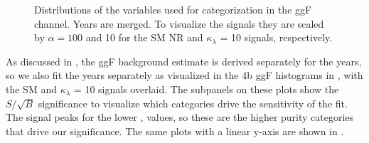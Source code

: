 \begin{figure}[ht]
	\centering
	\caption{Distributions of the variables used for categorization in the ggF channel.
	Years are merged.
	To visualize the signals they are scaled by $\alpha = 100$ and 10 for the SM NR and $\kappa_\lambda$ = 10 signals, respectively.}
	\label{fig:ggF-4b-deta-xhh-SR}
\end{figure}

As discussed in \Sect{\ref{sec:bkgdestimation}}, the ggF background estimate is derived separately for the years, so we also fit the years separately as visualized in the 4b ggF histograms in \Fig{\ref{fig:ggF-4b-disc-log}}, with the SM and $\kappa_\lambda$ = 10 signals overlaid. The subpanels on these plots show the $S / \sqrt{B}$ significance to visualize which categories drive the sensitivity of the fit.
The signal peaks for the lower \deta, \Xhh values, so these are the higher purity categories that drive our significance.
The same plots with a linear y-axis are shown in \Fig{\ref{fig:ggF-4b-disc}}.

